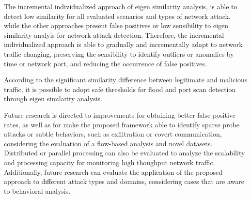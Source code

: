 The incremental individualized approach of eigen similarity analysis, is able to detect low similarity for all evaluated scenarios and types of network attack, while the other approaches present false positives or low sensibility to eigen similarity analyis for network attack detection. Therefore, the incremental individualized approach is able to gradually and incrementally adapt to network traffic changing, preserving the sensibility to identify outliers or anomalies by time or network port, and reducing the occurrence of false positives.

According to the significant similarity difference between legitimate and malicious traffic, it is possible to adopt safe thresholds for flood and port scan detection through eigen similarity analysis.

Future research is directed to improvements for obtaining better false positive rates, as well as for make the proposed framework able to identify sparse probe attacks or subtle behaviors, such as exfiltration or covert communication, considering the evaluation of a flow-based analysis and novel datasets. Distributed or parallel processing can also be evaluated to analyze the scalability and processing capacity for monitoring high thoughput network traffic. Additionally, future research can evaluate the application of the proposed approach to different attack types and domains, considering cases that are aware to behavioral analysis.